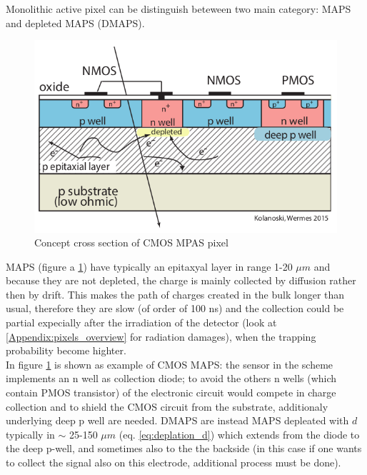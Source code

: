    Monolithic active pixel can be distinguish beteween two main category: MAPS and depleted MAPS (DMAPS).\\
   \begin{figure}
      \centering
      \includegraphics[width=.4\linewidth]{figures/Pixel_detectors/MAPS_scheme.png}
      \caption{Concept cross section of CMOS MPAS pixel}
      \label{fig:MAPS_scheme}
   \end{figure}
   MAPS (figure a \ref{fig:MAPS_scheme}) have typically an epitaxyal layer in range 1-20 $\mu m$ and because they are not depleted, the charge is mainly collected by diffusion rather then by drift. This makes the path of charges created in the bulk longer than usual, therefore they are slow (of order of 100 ns) and the collection could be partial expecially after the irradiation of the detector (look at \ref{Appendix:pixels_overview} for radiation damages), when the trapping probability become highter. \\
   In figure \ref{fig:MAPS_scheme} is shown as example of CMOS MAPS: the sensor in the scheme implements an n well as collection diode; to avoid the others n wells (which contain PMOS transistor) of the electronic circuit would compete in charge collection and to shield the CMOS circuit from the substrate, additionaly underlying deep p well are needed.
   DMAPS are instead MAPS depleated with $d$ typically in $\sim$ 25-150 $\mu m$ (eq. \ref{eq:deplation_d}) which extends from the diode to the deep p-well, and sometimes also to the the backside (in this case if one wants to collect the signal also on this electrode, additional process must be done).

